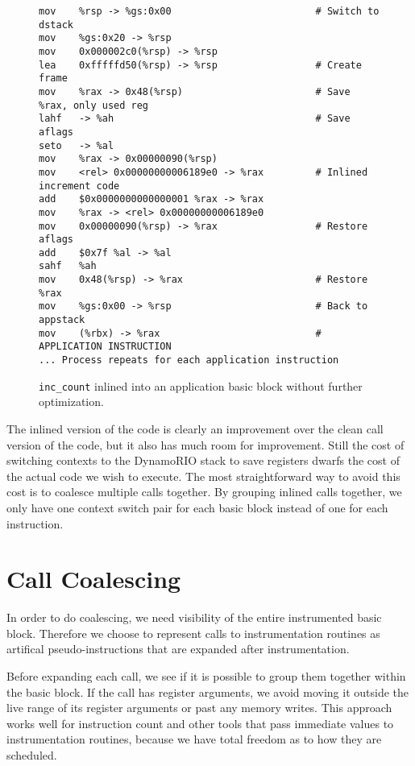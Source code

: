 \begin{figure}
\begin{verbatim}
mov    %rsp -> %gs:0x00                         # Switch to dstack
mov    %gs:0x20 -> %rsp 
mov    0x000002c0(%rsp) -> %rsp 
lea    0xfffffd50(%rsp) -> %rsp                 # Create frame
mov    %rax -> 0x48(%rsp)                       # Save %rax, only used reg
lahf   -> %ah                                   # Save aflags
seto   -> %al 
mov    %rax -> 0x00000090(%rsp) 
mov    <rel> 0x00000000006189e0 -> %rax         # Inlined increment code
add    $0x0000000000000001 %rax -> %rax 
mov    %rax -> <rel> 0x00000000006189e0 
mov    0x00000090(%rsp) -> %rax                 # Restore aflags
add    $0x7f %al -> %al 
sahf   %ah 
mov    0x48(%rsp) -> %rax                       # Restore %rax
mov    %gs:0x00 -> %rsp                         # Back to appstack
mov    (%rbx) -> %rax                           # APPLICATION INSTRUCTION
... Process repeats for each application instruction
\end{verbatim}
\caption{{\tt inc\_count} inlined into an application basic block without
further optimization.}
\label{fig:inscount_inlined}
\end{figure}

The inlined version of the code is clearly an improvement over the clean call
version of the code, but it also has much room for improvement.  Still the cost
of switching contexts to the DynamoRIO stack to save registers dwarfs the cost
of the actual code we wish to execute.  The most straightforward way to avoid
this cost is to coalesce multiple calls together.  By grouping inlined calls
together, we only have one context switch pair for each basic block instead of
one for each instruction.

\section{Call Coalescing}

In order to do coalescing, we need visibility of the entire instrumented basic
block.  Therefore we choose to represent calls to instrumentation routines as
artifical pseudo-instructions that are expanded after instrumentation.

Before expanding each call, we see if it is possible to group them together
within the basic block.  If the call has register arguments, we avoid moving it
outside the live range of its register arguments or past any memory writes.
This approach works well for instruction count and other tools that pass
immediate values to instrumentation routines, because we have total freedom as
to how they are scheduled.

